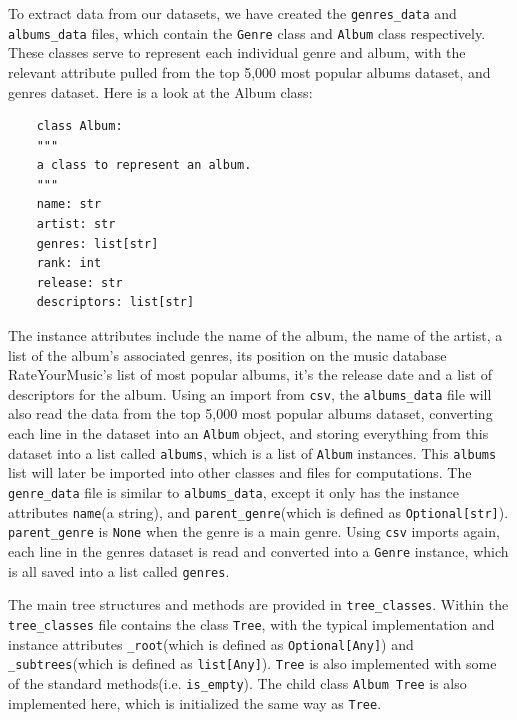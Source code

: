\documentclass[fontsize=11pt]{article}
\begin{document}
To extract data from our datasets, we have created the \texttt{genres\_data} and \texttt{albums\_data} files, which contain the \texttt{Genre} class and \texttt{Album} class respectively. These classes serve to represent each individual genre and album, with the relevant attribute pulled from the top 5,000 most popular albums dataset, and genres dataset. Here is a look at the Album class:
\begin{verbatim}  
    class Album:  
    """  
    a class to represent an album.  
    """  
    name: str  
    artist: str    
    genres: list[str]  
    rank: int  
    release: str  
    descriptors: list[str]  
\end{verbatim}  
The instance attributes include the name of the album, the name of the artist, a list of the album's associated genres, its position on the music database RateYourMusic's list of most popular albums, it's the release date and a list of descriptors for the album. Using an import from \texttt{csv}, the \texttt{albums\_data} file will also read the data from the top 5,000 most popular albums dataset, converting each line in the dataset into an \texttt{Album} object, and storing everything from this dataset into a list called \texttt{albums}, which is a list of \texttt{Album} instances. This \texttt{albums} list will later be imported into other classes and files for computations. The \texttt{genre\_data} file is similar to \texttt{albums\_data}, except it only has the instance attributes \texttt{name}(a string), and \texttt{parent\_genre}(which is defined as \texttt{Optional[str]}). \texttt{parent\_genre} is \texttt{None} when the genre is a main genre. Using \texttt{csv} imports again, each line in the genres dataset is read and converted into a \texttt{Genre} instance, which is all saved into a list called \texttt{genres}. \newline

The main tree structures and methods are provided in \texttt{tree\_classes}. Within the \texttt{tree\_classes} file contains the class \texttt{Tree}, with the typical implementation and instance attributes \texttt{\_root}(which is defined as \texttt{Optional[Any]}) and \texttt{\_subtrees}(which is defined as \texttt{list[Any]}). \texttt{Tree} is also implemented with some of the standard methods(i.e. \texttt{is\_empty}). The child class \texttt{Album Tree} is also implemented here, which is initialized the same way as \texttt{Tree}. \newline
\end{document}
